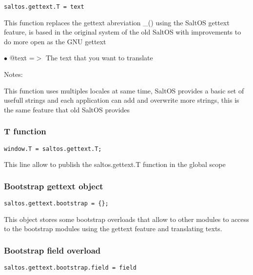 \documentclass[a4paper]{article}
\begin{document}
\begin{lstlisting}
saltos.gettext.T = text
\end{lstlisting}

This function replaces the gettext abreviation \_() using the SaltOS gettext
feature, is based in the original system of the old SaltOS with improvements
to do more open as the GNU gettext

\begin{compactitem}
\item[\color{myblue}$\bullet$] @text =$>$ The text that you want to translate
\end{compactitem}

Notes:

This function uses multiples locales at same time, SaltOS provides a basic set of
usefull strings and each application can add and overwrite more strings, this is
the same feature that old SaltOS provides

\hypertarget{toc800}{}
\subsubsection{T function}

\begin{lstlisting}
window.T = saltos.gettext.T;
\end{lstlisting}

This line allow to publish the saltos.gettext.T function in the global scope

\hypertarget{toc801}{}
\subsubsection{Bootstrap gettext object}

\begin{lstlisting}
saltos.gettext.bootstrap = {};
\end{lstlisting}

This object stores some bootstrap overloads that allow to other modules to
access to the bootstrap modules using the gettext feature and translating
texts.

\hypertarget{toc802}{}
\subsubsection{Bootstrap field overload}

\begin{lstlisting}
saltos.gettext.bootstrap.field = field
\end{lstlisting}
\end{document}
